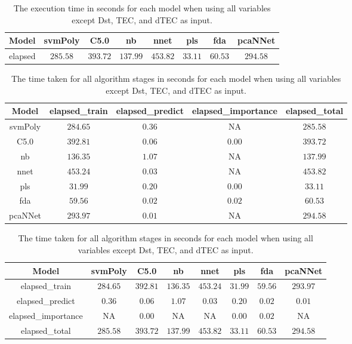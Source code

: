 \begin{table}[!ht]
	\centering
	\begin{tabular}{|c|c|c|c|c|c|c|c|}
		\hline
		Model & svmPoly & C5.0 & nb & nnet & pls & fda & pcaNNet \\ \hline
		elapsed & $285.58$ & $393.72$ & $137.99$ & $453.82$ & $33.11$ & $60.53$ & $294.58$ \\ \hline
	\end{tabular}
	\caption{The execution time in seconds for each model when using all variables except Dst, TEC, and dTEC as input.}
	\label{tab:time:reverse:noTEC:total}
\end{table}

\begin{table}[!ht]
	\centering
	\begin{tabular}{|c|c|c|c|c|}
		\hline
		Model & elapsed_train & elapsed_predict & elapsed_importance & elapsed_total \\ \hline
		svmPoly & $284.65$ & $0.36$ & NA & $285.58$ \\ \hline
		C5.0 & $392.81$ & $0.06$ & $0.00$ & $393.72$ \\ \hline
		nb & $136.35$ & $1.07$ & NA & $137.99$ \\ \hline
		nnet & $453.24$ & $0.03$ & NA & $453.82$ \\ \hline
		pls & $31.99$ & $0.20$ & $0.00$ & $33.11$ \\ \hline
		fda & $59.56$ & $0.02$ & $0.02$ & $60.53$ \\ \hline
		pcaNNet & $293.97$ & $0.01$ & NA & $294.58$ \\ \hline
	\end{tabular}
	\caption{The time taken for all algorithm stages in seconds for each model when using all variables except Dst, TEC, and dTEC as input.}
	\label{tab:time:noTEC}
\end{table}

\begin{table}[!ht]
	\centering
	\begin{tabular}{|c|c|c|c|c|c|c|c|}
		\hline
		Model & svmPoly & C5.0 & nb & nnet & pls & fda & pcaNNet \\ \hline
		elapsed_train & $284.65$ & $392.81$ & $136.35$ & $453.24$ & $31.99$ & $59.56$ & $293.97$ \\ \hline
		elapsed_predict & $0.36$ & $0.06$ & $1.07$ & $0.03$ & $0.20$ & $0.02$ & $0.01$ \\ \hline
		elapsed_importance & NA & $0.00$ & NA & NA & $0.00$ & $0.02$ & NA \\ \hline
		elapsed_total & $285.58$ & $393.72$ & $137.99$ & $453.82$ & $33.11$ & $60.53$ & $294.58$ \\ \hline
	\end{tabular}
	\caption{The time taken for all algorithm stages in seconds for each model when using all variables except Dst, TEC, and dTEC as input.}
	\label{tab:time:reverse:noTEC}
\end{table}

